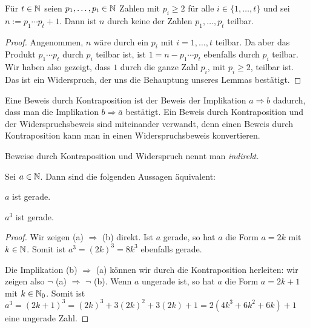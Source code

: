 \begin{lem}
	Für $t \in \mathbb{N}$ seien $p_1,\ldots,p_t \in \mathbb{N}$ Zahlen mit $p_i \ge 2$ für alle $i \in \{1,\ldots,t\}$ und sei $n := p_1 \cdots p_t + 1$. Dann ist $n$ durch keine der Zahlen $p_1,\ldots,p_t$ teilbar. 
\end{lem} 
\begin{proof} 
	Angenommen, $n$ wäre durch ein $p_i$ mit $i=1,\ldots,t$ teilbar. Da aber das Produkt $p_1 \cdots p_t$ durch $p_i$ teilbar ist, ist $1 = n - p_1 \cdots p_t$ ebenfalls durch $p_i$ teilbar. Wir haben also gezeigt, dass $1$ durch die ganze Zahl $p_i$, mit $p_i \ge 2$, teilbar ist. Das ist ein Widerspruch, der uns die Behauptung unseres Lemmas bestätigt. 
\end{proof} 

\begin{bem}
	Eine Beweis durch Kontraposition ist der Beweis der Implikation $a \Rightarrow b$ dadurch, dass man die Implikation $\overline{b} \Rightarrow \overline{a}$ bestätigt. Ein  Beweis durch Kontraposition und der Widerspruchsbeweis sind miteinander verwandt, denn einen Beweis durch Kontraposition kann man in einen Widerspruchsbeweis konvertieren. 
\end{bem} 

\begin{bem}
	Beweise durch Kontraposition und Widerspruch nennt man \emph{indirekt.} 
\end{bem} 

\begin{lem} \label{lem:a:a^3}
	Sei $a \in \mathbb{N}$. Dann sind die folgenden Aussagen äquivalent: 
	\begin{enuma}
		\item $a$ ist gerade. 
		\item $a^3$ ist gerade. 
	\end{enuma} 
\end{lem} 
\begin{proof} 
	Wir zeigen (a) $\Rightarrow$ (b) direkt. Ist $a$ gerade, so hat $a$ die Form $a = 2 k$ mit $k \in \mathbb{N}$. Somit ist $a^3 = (2 k)^3 = 8 k^3$ ebenfalls gerade. 
	
	Die Implikation (b) $\Rightarrow$ (a) können wir durch die Kontraposition herleiten: wir zeigen also $\neg$ (a) $\Rightarrow$ $\neg$ (b). Wenn $a$ ungerade ist, so hat $a$ die Form $a = 2 k+1$ mit $k \in \mathbb{N}_0$. Somit ist $a^3  = (2k + 1)^3 = (2k)^3 + 3 (2k)^2 + 3 (2k) + 1 = 2 ( 4 k^3 + 6 k^2 + 6 k) + 1$ eine ungerade Zahl.  
\end{proof} 


